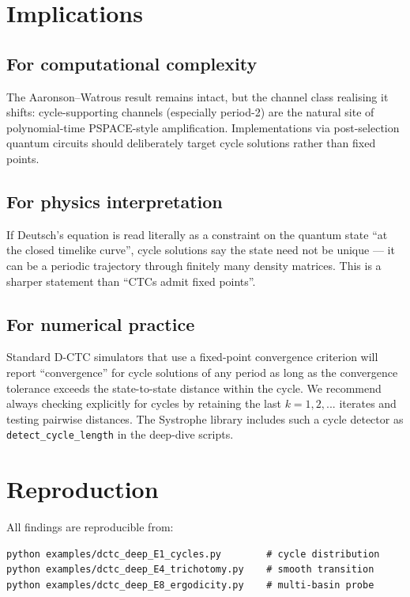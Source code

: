 \documentclass[11pt,a4paper]{article}
\begin{document}
\section{Implications}

\subsection*{For computational complexity}

The Aaronson--Watrous result remains intact, but the channel class
realising it shifts: cycle-supporting channels (especially period-2)
are the natural site of polynomial-time PSPACE-style amplification.
Implementations via post-selection quantum circuits should
deliberately target cycle solutions rather than fixed points.

\subsection*{For physics interpretation}

If Deutsch's equation is read literally as a constraint on the
quantum state ``at the closed timelike curve'', cycle solutions
say the state need not be unique --- it can be a periodic
trajectory through finitely many density matrices. This is a
sharper statement than ``CTCs admit fixed points''.

\subsection*{For numerical practice}

Standard D-CTC simulators that use a fixed-point convergence
criterion will report ``convergence'' for cycle solutions of any
period as long as the convergence tolerance exceeds the
state-to-state distance within the cycle. We recommend always
checking explicitly for cycles by retaining the last $k = 1, 2, ...$
iterates and testing pairwise distances. The Systrophe library
includes such a cycle detector as \texttt{detect\_cycle\_length} in
the deep-dive scripts.

\section{Reproduction}

All findings are reproducible from:

\begin{verbatim}
python examples/dctc_deep_E1_cycles.py        # cycle distribution
python examples/dctc_deep_E4_trichotomy.py    # smooth transition
python examples/dctc_deep_E8_ergodicity.py    # multi-basin probe
\end{verbatim}
\end{document}
